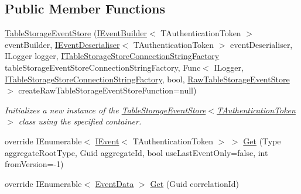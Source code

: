\subsection*{Public Member Functions}
\begin{DoxyCompactItemize}
\item 
\hyperlink{classCqrs_1_1Azure_1_1BlobStorage_1_1Events_1_1TableStorageEventStore_a25a65bc4a027b2a16ebf02e763ac3b95_a25a65bc4a027b2a16ebf02e763ac3b95}{Table\+Storage\+Event\+Store} (\hyperlink{interfaceCqrs_1_1Events_1_1IEventBuilder}{I\+Event\+Builder}$<$ T\+Authentication\+Token $>$ event\+Builder, \hyperlink{interfaceCqrs_1_1Events_1_1IEventDeserialiser}{I\+Event\+Deserialiser}$<$ T\+Authentication\+Token $>$ event\+Deserialiser, I\+Logger logger, \hyperlink{interfaceCqrs_1_1Azure_1_1BlobStorage_1_1ITableStorageStoreConnectionStringFactory}{I\+Table\+Storage\+Store\+Connection\+String\+Factory} table\+Storage\+Event\+Store\+Connection\+String\+Factory, Func$<$ I\+Logger, \hyperlink{interfaceCqrs_1_1Azure_1_1BlobStorage_1_1ITableStorageStoreConnectionStringFactory}{I\+Table\+Storage\+Store\+Connection\+String\+Factory}, bool, \hyperlink{classCqrs_1_1Azure_1_1BlobStorage_1_1Events_1_1TableStorageEventStore_1_1RawTableStorageEventStore}{Raw\+Table\+Storage\+Event\+Store} $>$ create\+Raw\+Table\+Storage\+Event\+Store\+Function=null)
\begin{DoxyCompactList}\small\item\em Initializes a new instance of the \hyperlink{classCqrs_1_1Azure_1_1BlobStorage_1_1Events_1_1TableStorageEventStore_a25a65bc4a027b2a16ebf02e763ac3b95_a25a65bc4a027b2a16ebf02e763ac3b95}{Table\+Storage\+Event\+Store$<$\+T\+Authentication\+Token$>$} class using the specified container. \end{DoxyCompactList}\item 
override I\+Enumerable$<$ \hyperlink{interfaceCqrs_1_1Events_1_1IEvent}{I\+Event}$<$ T\+Authentication\+Token $>$ $>$ \hyperlink{classCqrs_1_1Azure_1_1BlobStorage_1_1Events_1_1TableStorageEventStore_a420c94c86d8d1c2959aee8602f43c0c0_a420c94c86d8d1c2959aee8602f43c0c0}{Get} (Type aggregate\+Root\+Type, Guid aggregate\+Id, bool use\+Last\+Event\+Only=false, int from\+Version=-\/1)
\item 
override I\+Enumerable$<$ \hyperlink{classCqrs_1_1Events_1_1EventData}{Event\+Data} $>$ \hyperlink{classCqrs_1_1Azure_1_1BlobStorage_1_1Events_1_1TableStorageEventStore_a9b952a9257dc6f458b98eba87684412e_a9b952a9257dc6f458b98eba87684412e}{Get} (Guid correlation\+Id)
\end{DoxyCompactItemize}
